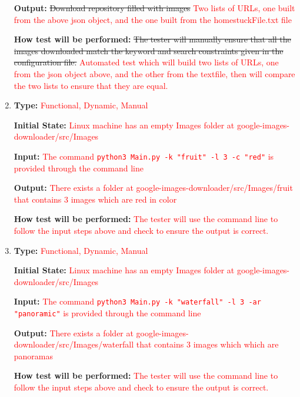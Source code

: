 \documentclass[12pt, titlepage]{article}
\begin{document}
\begin{enumerate}[label=FR-SQ\arabic*:, wide=0pt, leftmargin=*]
\textbf{Output:} \sout{Download repository filled with images}
\textcolor{red}{Two lists of URLs, one built from the above json object, and the one built from the homestuckFile.txt file}
					
\textbf{How test will be performed:} \sout{The tester will manually ensure that all the images downloaded match 
the keyword and search constraints given in the configuration file.}
\textcolor{red}{Automated test which will build two lists of URLs, one from the json object above, and the other 
from the textfile, then will compare the two lists to ensure that they are equal.}

\item \phantom{empty}

\textbf{Type:} \textcolor{red}{Functional, Dynamic, Manual}

\textbf{Initial State:} \textcolor{red}{Linux machine has an empty Images folder at google-images-downloader/src/Images}

\textbf{Input:} \textcolor{red}{The command \texttt{python3 Main.py -k "fruit" -l 3 -c "red"} is provided through the command line}

\textbf{Output:} \textcolor{red}{There exists a folder at google-images-downloader/src/Images/fruit that contains 3 images 
which are red in color}

\textbf{How test will be performed:} \textcolor{red}{The tester will use the command line to follow the input steps above and 
check to ensure the output is correct.}

\item \phantom{empty}

\textbf{Type:} \textcolor{red}{Functional, Dynamic, Manual}

\textbf{Initial State:} \textcolor{red}{Linux machine has an empty Images folder at google-images-downloader/src/Images}

\textbf{Input:} \textcolor{red}{The command \texttt{python3 Main.py -k "waterfall" -l 3 -ar "panoramic"} is provided through the command line}

\textbf{Output:} \textcolor{red}{There exists a folder at google-images-downloader/src/Images/waterfall that contains 3 images 
which which are panoramas}

\textbf{How test will be performed:} \textcolor{red}{The tester will use the command line to follow the input steps above and 
check to ensure the output is correct.}

\end{enumerate}
\end{document}

